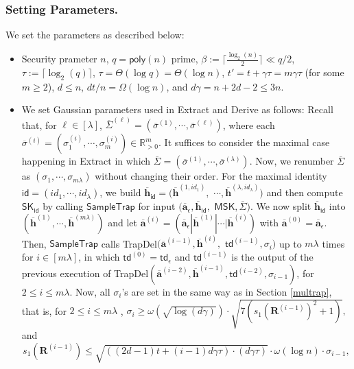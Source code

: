 \documentclass[runningheads]{llncs}
\begin{document}
\subsubsection{Setting Parameters.}  We set the parameters as described below:
 \begin{itemize} 
 	\item Security prameter $n$, $q=\textsf{poly}(n)$ prime, $\beta:=\lceil \frac{\log_2(n)}{2} \rceil \ll q/2$, $ \tau:=\lceil \log_2 (q) \rceil$, $\tau=\Theta(\log q)=\Theta(\log n)$,  $t'=t+\gamma \tau=m\gamma \tau$ (for some $m \geq 2$), $d \leq n$, $dt/n=\Omega(\log n)$, and $d\gamma=n+2d-2 \leq 3n$.
 	\item  
 	We set Gaussian parameters  used in \textsf{Extract} and \textsf{Derive} as follows: Recall that, for $\ell \in [\lambda]$, $\overline{\Sigma}^{(\ell)}=(\overline{\sigma}^{(1)},\cdots , \overline{\sigma}^{(\ell)})$, where each $ \overline{\sigma}^{(i)}=(\sigma^{(i)}_1, \cdots, \sigma^{(i)}_m) \in \mathbb{R}^{m}_{>0}$.  It suffices to consider the maximal case happening in \textsf{Extract} in which $\overline{\Sigma}=(\overline{\sigma}^{(1)},\cdots , \overline{\sigma}^{(\lambda)})$. Now, we renumber $\overline{\Sigma}$ as $(\sigma_1, \cdots, \sigma_{m\lambda})$ without changing their order. 
For the maximal identity $\textsf{id}=(id_1, \cdots, id_\lambda)$, we build $\overline{\mathbf{h}}_\mathsf{id}=( \overline{\mathbf{h}}^{(1,id_{1})}, $ $ \cdots,\overline{\mathbf{h}}^{(\lambda,id_\lambda)})$ and then compute  $\mathsf{SK}_{\textsf{id}}$ by calling $ \mathsf{SampleTrap}$ for input $(\overline{\mathbf{a}}_{\epsilon},\overline{\mathbf{h}}_{\mathsf{id}},$ $\mathsf{MSK},\overline{\Sigma})$. 
We now split $\overline{\mathbf{h}}_\mathsf{id}$ into $(\overline{\mathbf{h}}^{(1)}, \cdots, \overline{\mathbf{h}}^{(m\lambda)})$ and let $\overline{\mathbf{a}}^{(i)}=(\overline{\mathbf{a}}_{\epsilon}|\overline{\mathbf{h}}^{(1)}|\cdots| \overline{\mathbf{h}}^{(i)})$ with $\overline{\mathbf{a}}^{(0)}=\overline{\mathbf{a}}_{\epsilon}$. 
Then, $ \mathsf{SampleTrap}$ calls \textsf{TrapDel}$(\overline{\mathbf{a}}^{(i-1)},\overline{\mathbf{h}}^{(i)},$ $\mathsf{td}^{(i-1)},\sigma_{i})$
 up to $m \lambda$ times 
 for $i\in [m\lambda]$, in which  $\mathsf{td}^{(0)}=\mathsf{td}_{\epsilon}$ and 
 $\mathsf{td}^{(i-1)}$ is the output of the previous execution of \textsf{TrapDel}$(\overline{\mathbf{a}}^{(i-2)},\overline{\mathbf{h}}^{(i-1)},\mathsf{td}^{(i-2)},\sigma_{i-1})$, for $2 \leq i \leq m\lambda$. 
 Now, all $\sigma_i$'s are set in the same way as in Section \ref{multrap}, that is, for $2 \leq i \leq m \lambda$ , 
 	$\sigma_i \geq \omega(\sqrt{\log (d\gamma)})\cdot \sqrt{7(s_1(\mathbf{R}^{(i-1)})^2+1)}, $ and
 	 \begin{equation*}\label{k23}
 	s_1(\mathbf{R}^{(i-1)}) \leq \sqrt{((2d-1)t+(i-1)d\gamma \tau)\cdot (d\gamma \tau)}\cdot \omega(\log n)\cdot \sigma_{i-1},
 	\end{equation*}
 	

\end{itemize}
\end{document}
